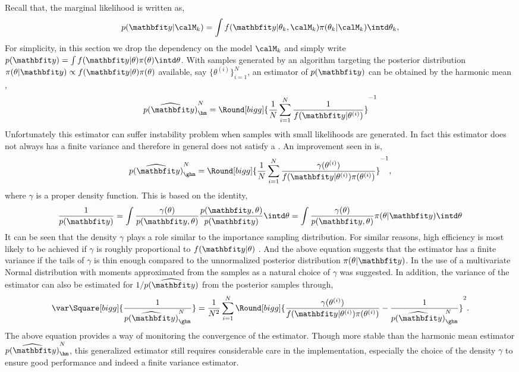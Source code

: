 Recall that, the marginal likelihood is written as,
\begin{equation*}
  p(\data|\calM_k) = \int
  f(\data|\theta_k,\calM_k)\pi(\theta_k|\calM_k)\intd\theta_k,
\end{equation*}
For simplicity, in this section we drop the dependency on the model $\calM_k$
and simply write $p(\data) = \int f(\data|\theta)\pi(\theta)\intd\theta$.
With samples generated by an \mcmc algorithm targeting the posterior
distribution $\pi(\theta|\data) \propto f(\data|\theta) \pi(\theta)$
available, say $\{\theta^{(i)}\}_{i=1}^N$, an estimator of $p(\data)$ can be
obtained by the harmonic mean \cite{Newton:1994wm},
\begin{equation}
  \widehat{p(\data)}_{\hm}^N =
  \Round[bigg]{\frac{1}{N}\sum_{i=1}^N\frac{1}{f(\data|\theta^{(i)})}}^{-1}
\end{equation}
Unfortunately this estimator can suffer instability problem when samples with
small likelihoods are generated. In fact this estimator does not always has a
finite variance and therefore in general does not satisfy a \clt. An
improvement seen in \cite{Kass:1995vb} is,
\begin{equation}
  \widehat{p(\data)}_{\ghm}^N = \Round[bigg]{
    \frac{1}{N}\sum_{i=1}^N
    \frac{\gamma(\theta^{(i)})}{f(\data|\theta^{(i)})\pi(\theta^{(i)})}}^{-1},
\end{equation}
where $\gamma$ is a proper density function. This is based on the identity,
\begin{equation}
  \frac{1}{p(\data)}
  = \int \frac{\gamma(\theta)}{p(\data,\theta)}
  \frac{p(\data,\theta)}{p(\data)} \intd \theta
  = \int \frac{\gamma(\theta)}{p(\data,\theta)} \pi(\theta|\data) \intd \theta
\end{equation}
It can be seen that the density $\gamma$ plays a role similar to the
importance sampling distribution. For similar reasons, high efficiency is most
likely to be achieved if $\gamma$ is roughly proportional to $f(\data|\theta)$
\cite{Kass:1995vb}. And the above equation suggests that the estimator has a
finite variance if the tails of $\gamma$ is thin enough compared to the
unnormalized posterior distribution $\pi(\theta|\data)$.
In \cite{Gelfand:1994ux} the use of a multivariate Normal distribution
with moments approximated from the samples as a natural choice of $\gamma$ was
suggested. In addition, the variance of the estimator can also be estimated
for $1/\widehat{p(\data)}$ from the posterior samples through,
\begin{equation}
  \var\Square[bigg]{\frac{1}{\widehat{p(\data)}_{\ghm}^N}} =
  \frac{1}{N^2}\sum_{i=1}^N \Round[bigg]{
    \frac{\gamma(\theta^{(i)})}{f(\data|\theta^{(i)})\pi(\theta^{(i)})}
    - \frac{1}{\widehat{p(\data)}_{\ghm}^N}}^2.
\end{equation}
The above equation provides a way of monitoring the convergence of the
estimator. Though more stable than the harmonic mean estimator
$\widehat{p(\data)}_{\hm}^N$, this generalized estimator still requires
considerable care in the implementation, especially the choice of the density
$\gamma$ to ensure good performance and indeed a finite variance estimator.

